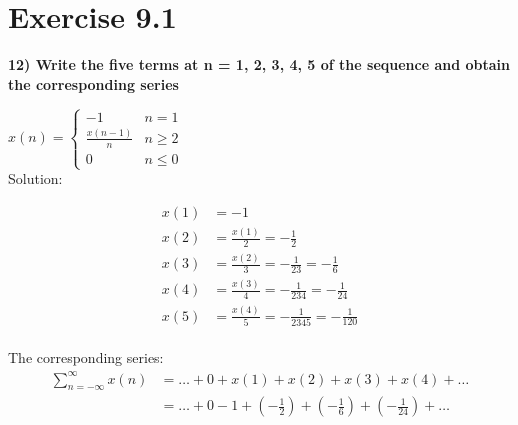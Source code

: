 \documentclass[journal,12pt,twocolumn]{IEEEtran}
\begin{document}


\vspace{3cm}

\title{}
\author{EE23BTECH11217 - Prajwal M$^{*}$
}
\maketitle
\newpage
\bigskip

\renewcommand{\thefigure}{\theenumi}
\renewcommand{\thetable}{\theenumi}


\section*{Exercise 9.1}

\noindent \textbf{12) \hspace{2pt}Write the five terms at n = 1, 2, 3, 4, 5 of the sequence and obtain the corresponding series}

$ x(n) = 
\begin{cases}
-1 & n = 1 \\
\frac{x(n-1)}{n} & n \geq 2 \\
 0 & n \leq 0
\end{cases}
$
\\

\noindent Solution: 

\noindent 
\begin{align*}
x(1) & = -1 \\
x(2) & = \frac{x(1)}{2} = -\frac{1}{2} \\
x(3) & = \frac{x(2)}{3} = -\frac{1}{2   3} = -\frac{1}{6}\\
x(4) & = \frac{x(3)}{4} = -\frac{1}{2   3   4} = -\frac{1}{24}\\
x(5) & = \frac{x(4)}{5} = -\frac{1}{2   3   4   5} = -\frac{1}{120}
\end{align*} \\


The corresponding series:
\begin{align*}
    \sum_{n=-\infty}^{\infty} x(n) & = \ldots + 0 + x(1) + x(2) + x(3) + x(4) + \ldots \\
    & = \ldots + 0 -1 + \left(-\frac{1}{2}\right) + \left(-\frac{1}{6}\right) + \left(-\frac{1}{24}\right) + \ldots \\ 
\end{align*}
\end{document}
